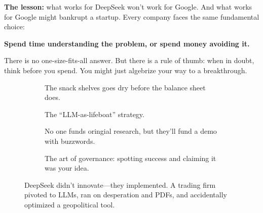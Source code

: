 \textbf{The lesson:} what works for DeepSeek won’t work for Google. And what works for Google might bankrupt a startup. Every company faces the same fundamental choice:

\begin{center}
\textbf{Spend time understanding the problem, or spend money avoiding it.}
\end{center}

There is no one-size-fits-all answer. But there is a rule of thumb: when in doubt, think before you spend. You might just algebrize your way to a breakthrough.


\begin{figure}[H]
  \centering

  \begin{subfigure}[t]{0.45\textwidth}
  \centering
  \caption*{The snack shelves goes dry before the balance sheet does.}
  \end{subfigure}
  \hfill
  \begin{subfigure}[t]{0.45\textwidth}
  \centering
  \caption*{The “LLM-as-lifeboat” strategy.}
  \end{subfigure}

  \vspace{1em}

  \begin{subfigure}[t]{0.45\textwidth}
  \centering
  \caption*{No one funds oringial research, but they'll fund a demo with buzzwords.}
  \end{subfigure}
  \hfill
  \begin{subfigure}[t]{0.45\textwidth}
  \centering
  \caption*{The art of governance: spotting success and claiming it was your idea.}
  \end{subfigure}

  \caption{DeepSeek didn’t innovate—they implemented. A trading firm pivoted to LLMs, ran on desperation and PDFs, and accidentally optimized a geopolitical tool.}
\end{figure}

